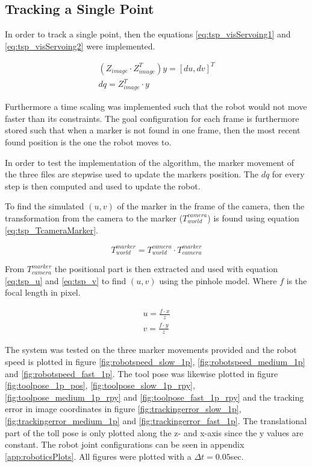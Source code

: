 \subsection{Tracking a Single Point}
In order to track a single point, then the equations \ref{eq:tsp_visServoing1} and \ref{eq:tsp_visServoing2}  were implemented.

\begin{eqnarray}
(Z_{image} \cdot Z_{image}^T) y = [du, dv]^T \label{eq:tsp_visServoing1} \\
dq = Z_{image}^T \cdot y \label{eq:tsp_visServoing2}
\end{eqnarray}

Furthermore a time scaling was implemented such that the robot would not move faster than its constraints.
The goal configuration for each frame is furthermore stored such that when a marker is not found in one frame, then the most recent found position is the one the robot moves to.

In order to test the implementation of the algorithm, the marker movement of the three files are stepwise used to update the markers position.
The $dq$ for every step is then computed and used to update the robot.

To find the simulated $(u,v)$ of the marker in the frame of the camera, then the transformation from the camera to the marker ($T_{world}^{camera}$) is found using equation \ref{eq:tsp_TcameraMarker}.

\begin{equation}
T_{world}^{marker} = T_{world}^{camera} \cdot T_{camera}^{marker} \label{eq:tsp_TcameraMarker}
\end{equation}

From $T_{camera}^{marker}$ the positional part is then extracted and used with equation \ref{eq:tsp_u} and \ref{eq:tsp_v} to find $(u,v)$ using the pinhole model.
Where $f$ is the focal length in pixel.

\begin{eqnarray}
u = \frac{f \cdot x}{z} \label{eq:tsp_u} \\
v = \frac{f \cdot y}{z} \label{eq:tsp_v}
\end{eqnarray}


The system was tested on the three marker movements provided and the robot speed is plotted in figure \ref{fig:robotspeed_slow_1p}, \ref{fig:robotspeed_medium_1p} and \ref{fig:robotspeed_fast_1p}.
The tool pose was likewise plotted in figure \ref{fig:toolpose_1p_pos}, \ref{fig:toolpose_slow_1p_rpy}, \ref{fig:toolpose_medium_1p_rpy} and \ref{fig:toolpose_fast_1p_rpy} and the tracking error in image coordinates in figure \ref{fig:trackingerror_slow_1p}, \ref{fig:trackingerror_medium_1p} and \ref{fig:trackingerror_fast_1p}.
The translational part of the toll pose is only plotted along the z- and x-axis since the y values are constant.
The robot joint configurations can be seen in appendix \ref{app:roboticsPlots}.
All figures were plotted with a $\Delta t = 0.05$sec.

